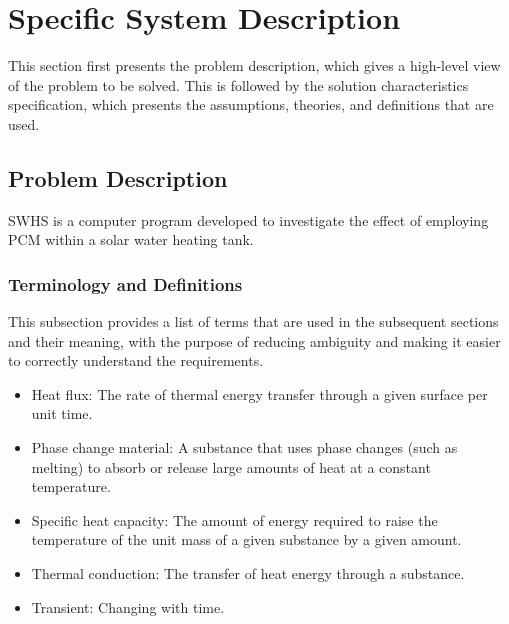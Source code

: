 \documentclass[12pt]{article}
\begin{document}
\section{Specific System Description}
\label{Sec:SpecSystDesc}
This section first presents the problem description, which gives a high-level view of the problem to be solved. This is followed by the solution characteristics specification, which presents the assumptions, theories, and definitions that are used.
\subsection{Problem Description}
\label{Sec:ProbDesc}
SWHS is a computer program developed to investigate the effect of employing PCM within a solar water heating tank.
\subsubsection{Terminology and Definitions}
\label{Sec:TermDefs}
This subsection provides a list of terms that are used in the subsequent sections and their meaning, with the purpose of reducing ambiguity and making it easier to correctly understand the requirements.
\begin{itemize}
\item{Heat flux: The rate of thermal energy transfer through a given surface per unit time.}
\item{Phase change material: A substance that uses phase changes (such as melting) to absorb or release large amounts of heat at a constant temperature.}
\item{Specific heat capacity: The amount of energy required to raise the temperature of the unit mass of a given substance by a given amount.}
\item{Thermal conduction: The transfer of heat energy through a substance.}
\item{Transient: Changing with time.}
\end{itemize}
\end{document}
